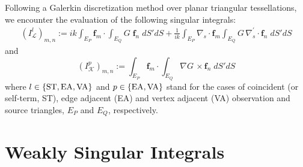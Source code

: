 \documentclass[a4wide,11pt]{article}
\renewcommand{\vec}[1]{\mathbf{#1}}
\newcommand{\bc}[1]{\boldsymbol{\mathcal{#1}}}
\begin{document}
Following a Galerkin discretization method over planar triangular tessellations, we encounter the evaluation of the following singular integrals:
\begin{equation}\label{I_WS}
\begin{split}
(I_{\bc{L}}^l)_{m,n}:=  ik\int_{E_P} \vec{f}_m\cdot\int_{E_Q}G\;\vec{f}_n\;dS' dS
 + \frac{1}{ik} \int_{E_P} \nabla_s\cdot\vec{f}_m \int_{E_Q} G\, \nabla_s^{'}\cdot\vec{f}_n\;dS' dS
\end{split}
\end{equation}
and
\begin{equation}\label{I_SS}
(I_{\bc{K}}^p)_{m,n}:= \int_{E_P} \vec{f}_m \cdot\int_{E_Q}\nabla G\, \times \vec{f}_n\;dS' dS
\end{equation}
where $l\in \{{\rm ST,EA,VA}\}$ and $p\in \{{\rm EA,VA}\}$ stand for the cases of coincident (or self-term, ST), edge adjacent (EA) and vertex adjacent (VA) observation and source triangles, $E_P$ and $E_Q$, respectively.

\section{Weakly Singular Integrals}
\end{document}
